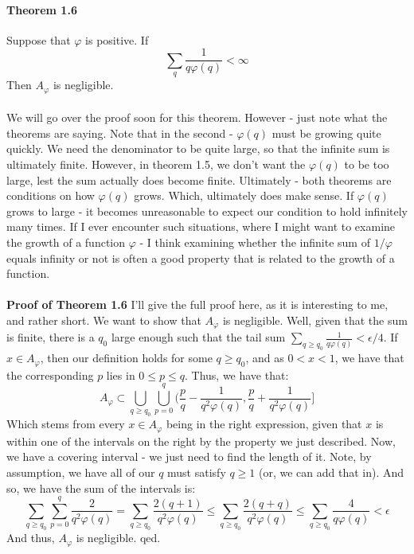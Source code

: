 \documentclass[12pt,a4paper]{article}
\newcommand{\1}[1]{\mathbbm{1}\left\{ #1 \right\}}
\begin{document}
\paragraph{Theorem 1.6} Suppose that $\varphi$ is positive. If
$$
	\sum_q \frac{1}{q\varphi(q)} < \infty
$$
Then $A_\varphi$ is negligible.
\\\\
We will go over the proof soon for this theorem. However - just note what the theorems are saying. Note that in the second - $\varphi(q)$ must be growing quite quickly. We need the denominator to be quite large, so that the infinite sum is ultimately finite. However, in theorem 1.5, we don't want the $\varphi(q)$ to be too large, lest the sum actually does become finite. Ultimately - both theorems are conditions on how $\varphi(q)$ grows. Which, ultimately does make sense. If $\varphi(q)$ grows to large - it becomes unreasonable to expect our condition to hold infinitely many times. If I ever encounter such situations, where I might want to examine the growth of a function $\varphi$ - I think examining whether the infinite sum of $1/\varphi$ equals infinity or not is often a good property that is related to the growth of a function.
\\\\
\textbf{Proof of Theorem 1.6} I'll give the full proof here, as it is interesting to me, and rather short. We want to show that $A_\varphi$ is negligible. Well, given that the sum is finite, there is a $q_0$ large enough such that the tail sum $\sum_{q \geq q_0} \frac{1}{q\varphi(q)} < \epsilon/4$. If $x \in A_\varphi$, then our definition holds for some $q \geq q_0$, and as $0 < x < 1$, we have that the corresponding $p$ lies in $0 \leq p \leq q$. Thus, we have that:
$$
	A_\varphi \subset \bigcup_{q \geq q_0} \bigcup_{p = 0}^q 
	\bigg(\frac{p}{q} - \frac{1}{q^2\varphi(q)}, \frac{p}{q} + \frac{1}{q^2\varphi(q)}\bigg]
$$
Which stems from every $x \in A_\varphi$ being in the right expression, given that $x$ is within one of the intervals on the right by the property we just described. Now, we have a covering interval - we just need to find the length of it. Note, by assumption, we have all of our $q$ must satisfy $q \geq 1$ (or, we can add that in). And so, we have the sum of the intervals is:
$$
	\sum_{q \geq q_0} \sum_{p = 0}^q \frac{2}{q^2\varphi(q)} =
	\sum_{q \geq q_0} \frac{2(q + 1)}{q^2\varphi(q)} \leq
	\sum_{q \geq q_0} \frac{2(q + q)}{q^2\varphi(q)} \leq
	\sum_{q \geq q_0} \frac{4}{q\varphi(q)} < \epsilon
$$
And thus, $A_\varphi$ is negligible. qed.
\end{document}

